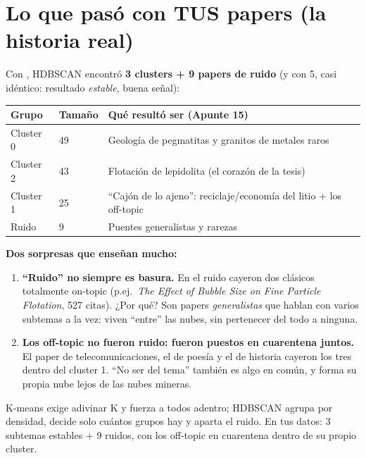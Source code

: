 \documentclass[11pt,a4paper]{article}
\begin{document}
\section{Lo que pasó con TUS papers (la historia real)}

Con , HDBSCAN encontró \textbf{3 clusters + 9 papers de ruido}
(y con 5, casi idéntico: resultado \emph{estable}, buena señal):

\begin{center}
\begin{tabular}{llp{6.6cm}}
\textbf{Grupo} & \textbf{Tamaño} & \textbf{Qué resultó ser (Apunte 15)} \\
\hline
Cluster 0 & 49 & Geología de pegmatitas y granitos de metales raros \\
Cluster 2 & 43 & Flotación de lepidolita (el corazón de la tesis) \\
Cluster 1 & 25 & ``Cajón de lo ajeno'': reciclaje/economía del litio + los off-topic \\
Ruido & 9 & Puentes generalistas y rarezas \\
\end{tabular}
\end{center}

\begin{ojo}
\textbf{Dos sorpresas que enseñan mucho:}
\begin{enumerate}
  \item \textbf{``Ruido'' no siempre es basura.} En el ruido cayeron dos clásicos totalmente
        on-topic (p.ej.\ \emph{The Effect of Bubble Size on Fine Particle Flotation}, 527
        citas). ¿Por qué? Son papers \emph{generalistas} que hablan con varios subtemas a la
        vez: viven ``entre'' las nubes, sin pertenecer del todo a ninguna.
  \item \textbf{Los off-topic no fueron ruido: fueron puestos en cuarentena juntos.} El paper
        de telecomunicaciones, el de poesía y el de historia cayeron los tres dentro del
        cluster 1. ``No ser del tema'' también es algo en común, y forma su propia nube lejos
        de las nubes mineras.
\end{enumerate}
\end{ojo}

\begin{resumen}
K-means exige adivinar K y fuerza a todos adentro; HDBSCAN agrupa por densidad, decide solo
cuántos grupos hay y aparta el ruido. En tus datos: 3 subtemas estables + 9 ruidos, con los
off-topic en cuarentena dentro de su propio cluster.
\end{resumen}
\clearpage
{}
{}
\end{document}
